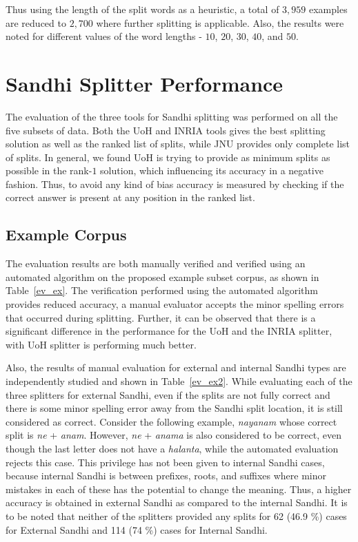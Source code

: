 \documentclass[11pt]{article}
\begin{document}
Thus using the length of the split words as a heuristic, a total of $3,959$ examples are reduced to $2,700$ where further splitting is applicable. Also, the results were noted for different values of the word lengths - $10$, $20$, $30$, $40$, and $50$.

\section{Sandhi Splitter Performance}
\label{sect:methodology}

The evaluation of the three tools for Sandhi splitting was performed on all the five subsets of data. Both the UoH and INRIA tools gives the best splitting solution as well as the ranked list of splits, while JNU provides only complete list of splits. In general, we found UoH is trying to provide as minimum splits as possible in the rank-$1$ solution, which influencing its accuracy in a negative fashion. Thus, to avoid any kind of bias accuracy is measured by checking if the correct answer is present at any position in the ranked list.

\subsection{Example Corpus}
The evaluation results are both manually verified and verified using an automated algorithm on the proposed example subset corpus, as shown in Table~\ref{ev_ex}. The verification performed using the automated algorithm provides reduced accuracy, a manual evaluator accepts the minor spelling errors that occurred during splitting. Further, it can be observed that there is a significant difference in the performance for the UoH and the INRIA splitter, with UoH splitter is performing much better. 

Also, the results of manual evaluation for external and internal Sandhi types are independently studied and shown in Table~\ref{ev_ex2}. While evaluating each of the three splitters for external Sandhi, even if the splits are not fully correct and there is some minor spelling error away from the Sandhi split location, it is still considered as correct. Consider the following example, \textit{nayanam} whose correct split is \textit{ne} + \textit{anam}. However, \textit{ne}  + \textit{anama} is also considered to be correct, even though the last letter does not have a \textit{halanta}, while the automated evaluation rejects this case. This privilege has not been given to internal Sandhi cases, because internal Sandhi is between prefixes, roots, and suffixes where minor mistakes in each of these has the potential to change the meaning. Thus, a higher accuracy is obtained in external Sandhi as compared to the internal Sandhi. It is to be noted that neither of the splitters provided any splits for 62 (46.9 \%) cases for External Sandhi and 114 (74 \%) cases for Internal Sandhi.
\end{document}
